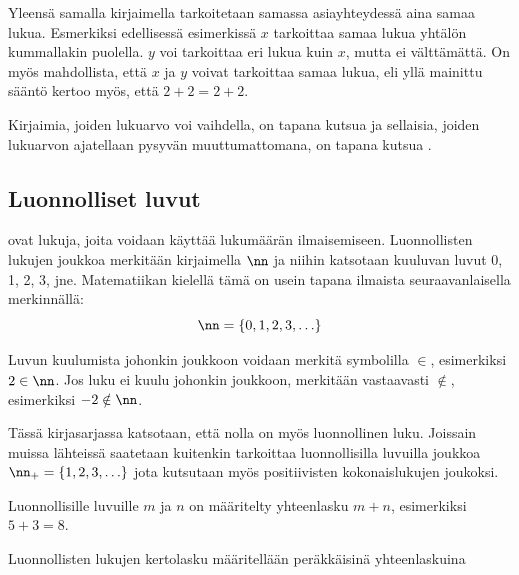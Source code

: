 Yleensä samalla kirjaimella tarkoitetaan samassa asiayhteydessä aina samaa lukua.
Esmerkiksi edellisessä esimerkissä $x$ tarkoittaa samaa lukua yhtälön kummallakin puolella. $y$ voi tarkoittaa eri lukua kuin $x$, mutta
ei välttämättä. On myös mahdollista, että $x$ ja $y$ voivat tarkoittaa samaa lukua, eli yllä mainittu sääntö kertoo myös, että $2+2=2+2$.


Kirjaimia, joiden lukuarvo voi vaihdella, on tapana kutsua  ja sellaisia,
joiden lukuarvon ajatellaan pysyvän muuttumattomana, on tapana kutsua .

\subsection*{Luonnolliset luvut}

%
%

 ovat lukuja, joita voidaan käyttää lukumäärän ilmaisemiseen.
Luonnollisten lukujen joukkoa merkitään kirjaimella $\nn$ ja niihin katsotaan kuuluvan luvut 0, 1, 2, 3, jne.
Matematiikan kielellä tämä on usein tapana ilmaista seuraavanlaisella merkinnällä: \[\nn = \{0, 1, 2, 3, \ldots\}\]

Luvun kuulumista johonkin joukkoon voidaan merkitä symbolilla $\in$,
esimerkiksi $2 \in \nn$. Jos luku ei kuulu johonkin joukkoon, merkitään vastaavasti $\notin$, esimerkiksi
$-2 \notin \nn$.

Tässä kirjasarjassa katsotaan, että nolla on myös luonnollinen luku. Joissain muissa lähteissä saatetaan kuitenkin
tarkoittaa luonnollisilla luvuilla joukkoa $\nn_+ = \{1, 2, 3, \ldots\}$ jota kutsutaan myös positiivisten kokonaislukujen joukoksi.

Luonnollisille luvuille $m$ ja $n$ on määritelty yhteenlasku $m + n$, esimerkiksi $5 + 3 = 8$.

Luonnollisten lukujen kertolasku määritellään peräkkäisinä yhteenlaskuina


